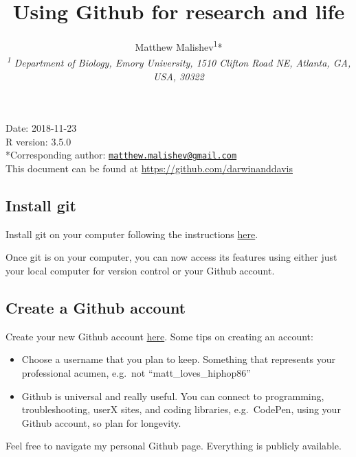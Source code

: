 \documentclass[10,portrait]{article}
\title{Using Github for research and life}
\author{Matthew
Malishev\textsuperscript{1}*\\[2\baselineskip]\emph{\textsuperscript{1}
Department of Biology, Emory University, 1510 Clifton Road NE, Atlanta,
GA, USA, 30322}}
\date{}
\providecommand{\tightlist}{%
  \setlength{\itemsep}{0pt}\setlength{\parskip}{0pt}}
\begin{document}
\maketitle

{
\hypersetup{linkcolor=black}
\setcounter{tocdepth}{4}
\tableofcontents
}
\newpage   

Date: 2018-11-23\\
R version: 3.5.0\\
*Corresponding author:
\href{mailto:matthew.malishev@gmail.com}{\nolinkurl{matthew.malishev@gmail.com}}\\
This document can be found at \url{https://github.com/darwinanddavis}\\
\newpage  

\subsection{Install git}\label{install-git}

Install git on your computer following the instructions
\href{https://git-scm.com/book/en/v2/Getting-Started-Installing-Git}{here}.

Once git is on your computer, you can now access its features using
either just your local computer for version control or your Github
account.

\subsection{Create a Github account}\label{create-a-github-account}

Create your new Github account \href{https://github.com/}{here}. Some
tips on creating an account:

\begin{itemize}
\tightlist
\item
  Choose a username that you plan to keep. Something that represents
  your professional acumen, e.g.~not ``matt\_loves\_hiphop86''\\
  \hspace*{0.333em}
\item
  Github is universal and really useful. You can connect to programming,
  troubleshooting, userX sites, and coding libraries, e.g.~CodePen,
  using your Github account, so plan for longevity.\\
  \hspace*{0.333em}
\end{itemize}

Feel free to navigate my personal Github page. Everything is publicly
available.
\end{document}
